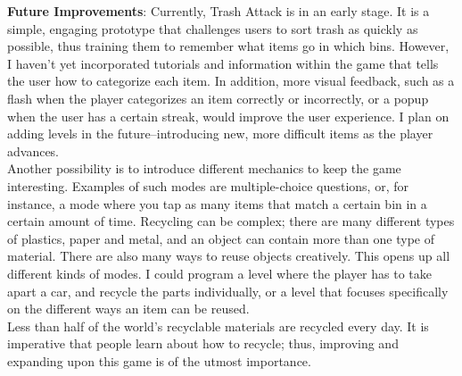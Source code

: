 \documentclass[11pt]{article}
\begin{document}
\newpage
\textbf{Future Improvements}: Currently, Trash Attack is in an early stage. It is a simple, engaging prototype that challenges users to sort trash as quickly as possible, thus training them to remember what items go in which bins. However, I haven't yet incorporated tutorials and information within the game that tells the user how to categorize each item. In addition, more visual feedback, such as a flash when the player categorizes an item correctly or incorrectly, or a popup when the user has a certain streak, would improve the user experience. I plan on adding levels in the future--introducing new, more difficult items as the player advances. 
\\[3ex]
Another possibility is to introduce different mechanics to keep the game interesting. Examples of such modes are multiple-choice questions, or, for instance, a mode where you tap as many items that match a certain bin in a certain amount of time.  Recycling can be complex; there are many different types of plastics, paper and metal, and an object can contain more than one type of material. There are also many ways to reuse objects creatively. This opens up all different kinds of modes. I could program a level where the player has to take apart a car, and recycle the parts individually, or a level that focuses specifically on the different ways an item can be reused. 
\\[3ex]
Less than half of the world's recyclable materials are recycled every day. It is imperative that people learn about how to recycle; thus, improving and expanding upon this game is of the utmost importance. 
\end{document}
